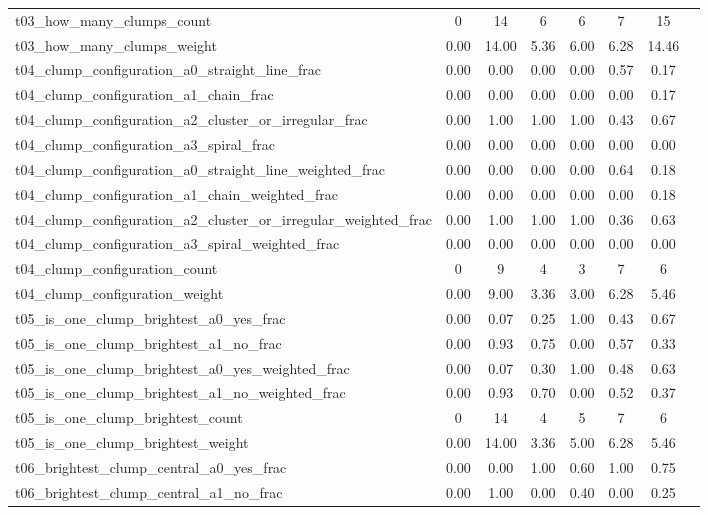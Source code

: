 \begin{table*}
{\begin{tabular}{@{}lccccccc}
t03\_how\_many\_clumps\_count & 0 & 14 & 6 & 6 & 7 & 15 &\\
t03\_how\_many\_clumps\_weight & 0.00 & 14.00 & 5.36 & 6.00 & 6.28 & 14.46 &\\
t04\_clump\_configuration\_a0\_straight\_line\_frac & 0.00 & 0.00 & 0.00 & 0.00 & 0.57 & 0.17 &\\
t04\_clump\_configuration\_a1\_chain\_frac & 0.00 & 0.00 & 0.00 & 0.00 & 0.00 & 0.17 &\\
t04\_clump\_configuration\_a2\_cluster\_or\_irregular\_frac & 0.00 & 1.00 & 1.00 & 1.00 & 0.43 & 0.67 &\\
t04\_clump\_configuration\_a3\_spiral\_frac & 0.00 & 0.00 & 0.00 & 0.00 & 0.00 & 0.00 &\\
t04\_clump\_configuration\_a0\_straight\_line\_weighted\_frac & 0.00 & 0.00 & 0.00 & 0.00 & 0.64 & 0.18 &\\
t04\_clump\_configuration\_a1\_chain\_weighted\_frac & 0.00 & 0.00 & 0.00 & 0.00 & 0.00 & 0.18 &\\
t04\_clump\_configuration\_a2\_cluster\_or\_irregular\_weighted\_frac & 0.00 & 1.00 & 1.00 & 1.00 & 0.36 & 0.63 &\\
t04\_clump\_configuration\_a3\_spiral\_weighted\_frac & 0.00 & 0.00 & 0.00 & 0.00 & 0.00 & 0.00 &\\
t04\_clump\_configuration\_count & 0 & 9 & 4 & 3 & 7 & 6 &\\
t04\_clump\_configuration\_weight & 0.00 & 9.00 & 3.36 & 3.00 & 6.28 & 5.46 &\\
t05\_is\_one\_clump\_brightest\_a0\_yes\_frac & 0.00 & 0.07 & 0.25 & 1.00 & 0.43 & 0.67 &\\
t05\_is\_one\_clump\_brightest\_a1\_no\_frac & 0.00 & 0.93 & 0.75 & 0.00 & 0.57 & 0.33 &\\
t05\_is\_one\_clump\_brightest\_a0\_yes\_weighted\_frac & 0.00 & 0.07 & 0.30 & 1.00 & 0.48 & 0.63 &\\
t05\_is\_one\_clump\_brightest\_a1\_no\_weighted\_frac & 0.00 & 0.93 & 0.70 & 0.00 & 0.52 & 0.37 &\\
t05\_is\_one\_clump\_brightest\_count & 0 & 14 & 4 & 5 & 7 & 6 &\\
t05\_is\_one\_clump\_brightest\_weight & 0.00 & 14.00 & 3.36 & 5.00 & 6.28 & 5.46 &\\
t06\_brightest\_clump\_central\_a0\_yes\_frac & 0.00 & 0.00 & 1.00 & 0.60 & 1.00 & 0.75 &\\
t06\_brightest\_clump\_central\_a1\_no\_frac & 0.00 & 1.00 & 0.00 & 0.40 & 0.00 & 0.25 &\\

\end{tabular}}
\end{table*}
